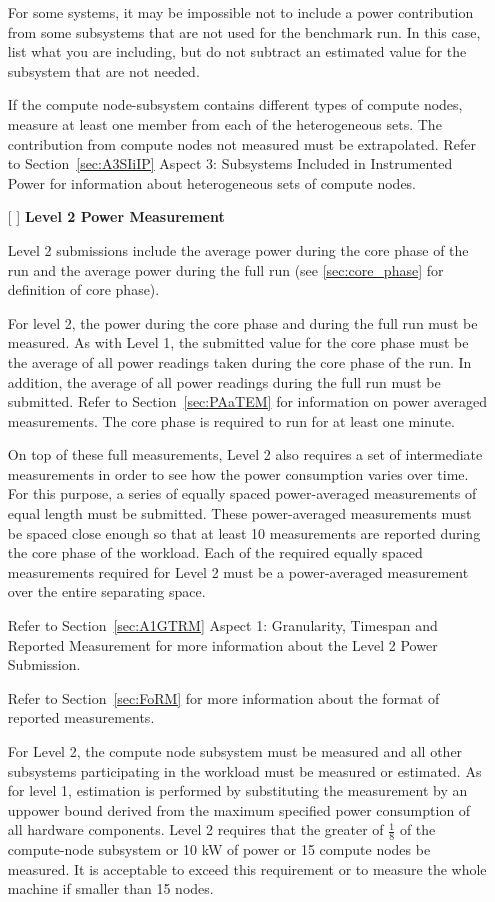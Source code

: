\begin{itemize}
For some systems, it may be impossible not to include a power contribution from some subsystems that are not used for the benchmark run.
In this case, list what you are including, but do not subtract an estimated value for the subsystem that are not needed.

If the compute node-subsystem contains different types of compute nodes, measure at least one member from each of the heterogeneous sets. The contribution from compute nodes not measured must be extrapolated. Refer to 
Section~\ref{sec:A3SIiIP} Aspect 3: Subsystems Included in Instrumented Power for information about heterogeneous sets of compute nodes.

\newpage
\item[{[ ]}]
\textbf{Level 2 Power Measurement}

Level 2 submissions include the average power during the core phase of the run and the average power during the full run (see \ref{sec:core_phase} for definition of core phase).

For level 2, the power during the core phase and during the full run must be measured.
As with Level 1, the submitted value for the core phase must be the average of all power readings taken during the core phase of the run.
In addition, the average of all power readings during the full run must be submitted.
Refer to Section~\ref{sec:PAaTEM} for information on power averaged measurements.
The core phase is required to run for at least one minute.

On top of these full measurements, Level 2 also requires a set of intermediate measurements in order to see how the power consumption varies over time.
For this purpose, a series of equally spaced power-averaged measurements of equal length must be submitted.
These power-averaged measurements must be spaced close enough so that at least 10 measurements are reported during the core phase of the workload.
Each of the required equally spaced measurements required for Level 2 must be a power-averaged measurement over the entire separating space. 

Refer to Section~\ref{sec:A1GTRM} Aspect 1: Granularity, Timespan and Reported Measurement for more information about the Level 2 Power Submission. 

Refer to Section~\ref{sec:FoRM} for more information about the format of reported measurements.

For Level 2, the compute node subsystem must be measured and all other subsystems participating in the workload must be measured or estimated.
As for level 1, estimation is performed by substituting the measurement by an uppower bound derived from the maximum specified power consumption of all hardware components.
Level 2 requires that the greater of $ \frac{1}{8} $ of the compute-node subsystem or 10 kW of power or 15 compute nodes be measured.
It is acceptable to exceed this requirement or to measure the whole machine if smaller than 15 nodes.


\end{itemize}
